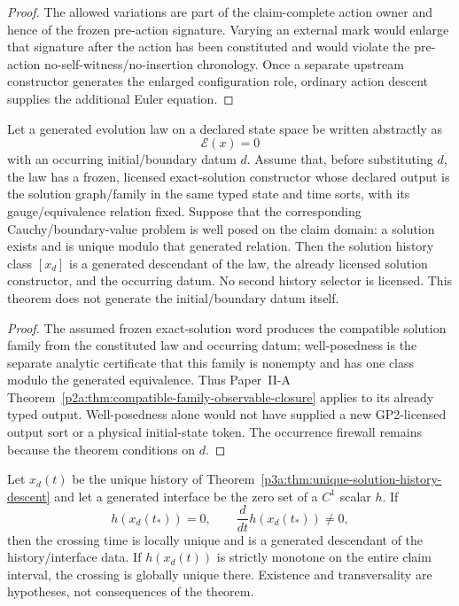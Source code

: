\documentclass[12pt,a4paper]{article}
\begin{document}
\begin{proof}
The allowed variations are part of the claim-complete action owner and hence
of the frozen pre-action signature.  Varying an external mark would enlarge
that signature after the action has been constituted and would violate the
pre-action no-self-witness/no-insertion chronology.  Once a separate upstream
constructor generates the enlarged configuration role, ordinary action descent
supplies the additional Euler equation.
\end{proof}

\begin{theorem}
\label{p3a:thm:unique-solution-history-descent}
Let a generated evolution law on a declared state space be written abstractly
as
\[
 \mathcal E(x)=0
\]
with an occurring initial/boundary datum $d$.  Assume that, before
substituting $d$, the law has a frozen, licensed exact-solution constructor
whose declared output is the solution graph/family in the same typed state
and time sorts, with its gauge/equivalence relation fixed.  Suppose that the
corresponding Cauchy/boundary-value problem is well posed on the claim
domain: a solution exists and is unique modulo that generated relation.
Then the solution history class $[x_d]$ is a generated descendant of the law,
the already licensed solution constructor, and the occurring datum.  No second history selector is licensed.  This
theorem does not generate the initial/boundary datum itself.
\end{theorem}

\begin{proof}
The assumed frozen exact-solution word produces the compatible solution
family from the constituted law and occurring datum; well-posedness is the
separate analytic certificate that this family is nonempty and has one
class modulo the generated equivalence.  Thus Paper~II-A
Theorem~\ref{p2a:thm:compatible-family-observable-closure} applies to its
already typed output.  Well-posedness alone would not have supplied a new
GP2-licensed output sort or a physical initial-state token.  The occurrence
firewall remains because the theorem conditions on $d$.
\end{proof}

\begin{corollary}
\label{p3a:cor:transverse-crossing-descendant}
Let $x_d(t)$ be the unique history of
Theorem~\ref{p3a:thm:unique-solution-history-descent} and let a generated
interface be the zero set of a $C^1$ scalar $h$.  If
\[
 h(x_d(t_*))=0,
 \qquad
 \frac{d}{dt}h(x_d(t_*))\neq0,
\]
then the crossing time is locally unique and is a generated descendant of the
history/interface data.  If $h(x_d(t))$ is strictly monotone on the entire
claim interval, the crossing is globally unique there.  Existence and
transversality are hypotheses, not consequences of the theorem.
\end{corollary}
\end{document}
